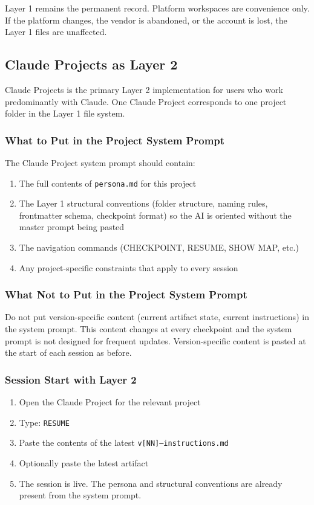 \documentclass[12pt,letterpaper]{article}
\begin{document}
Layer 1 remains the permanent record. Platform workspaces are convenience
only. If the platform changes, the vendor is abandoned, or the account
is lost, the Layer 1 files are unaffected.

\subsection{Claude Projects as Layer 2}

Claude Projects is the primary Layer 2 implementation for users who work
predominantly with Claude. One Claude Project corresponds to one project
folder in the Layer 1 file system.

\subsubsection{What to Put in the Project System Prompt}

The Claude Project system prompt should contain:

\begin{enumerate}
  \item The full contents of \texttt{persona.md} for this project
  \item The Layer 1 structural conventions (folder structure, naming rules,
        frontmatter schema, checkpoint format) so the AI is oriented
        without the master prompt being pasted
  \item The navigation commands (CHECKPOINT, RESUME, SHOW MAP, etc.)
  \item Any project-specific constraints that apply to every session
\end{enumerate}

\subsubsection{What Not to Put in the Project System Prompt}

Do not put version-specific content (current artifact state, current
instructions) in the system prompt. This content changes at every checkpoint
and the system prompt is not designed for frequent updates.
Version-specific content is pasted at the start of each session as before.

\subsubsection{Session Start with Layer 2}

\begin{enumerate}
  \item Open the Claude Project for the relevant project
  \item Type: \texttt{RESUME}
  \item Paste the contents of the latest \texttt{v[NN]--instructions.md}
  \item Optionally paste the latest artifact
  \item The session is live. The persona and structural conventions
        are already present from the system prompt.
\end{enumerate}
\end{document}
